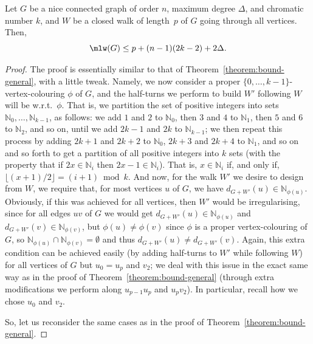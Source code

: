 \documentclass[a4paper,11pt,dvipsnames]{elsarticle}
\newcommand{\sam}[1]{\todo[size=\tiny,color=red!20!white]{\textbf{Sam:} #1}}
\newcommand{\sam}[1]{}
\begin{document}
\begin{theorem}\label{theorem:bound-chromatic}
Let $G$ be a nice connected graph of order $n$, maximum degree $\Delta$, and chromatic number $k$,
and $W$ be a closed walk of length~$p$ of $G$ going through all vertices. 
Then, $$\mlw(G) \leq p + (n-1)(2k-2)+2\Delta.$$
\end{theorem}

\begin{proof}
The proof is essentially similar to that of Theorem~\ref{theorem:bound-general}, with a little tweak. Namely, we now consider a proper $\{0,\dots,k-1\}$-vertex-colouring
$\phi$ of $G$, and the half-turns we perform to build $W'$ following $W$ will be w.r.t.~$\phi$.
That is, we partition the set of positive integers into sets $\mathbb{N}_0,\dots,\mathbb{N}_{k-1}$, as follows: we add $1$ and $2$ to $\mathbb{N}_0$, then $3$ and $4$ to $\mathbb{N}_1$, then $5$ and $6$ to $\mathbb{N}_2$, and so on, until we add $2k-1$ and $2k$ to $\mathbb{N}_{k-1}$; we then repeat this process by adding $2k+1$ and $2k+2$ to $\mathbb{N}_0$, $2k+3$ and $2k+4$ to $\mathbb{N}_1$, and so on and so forth to get a partition of all positive integers into $k$ sets (with the property that if $2x \in \mathbb{N}_i$ then $2x-1 \in \mathbb{N}_i$). That is, $x\in\mathbb N_i$ if, and only if, $\lfloor (x+1)/2 \rfloor = (i+1)\bmod k$.
And now, for the walk $W'$ we desire to design from $W$, we require that, for most vertices $u$ of $G$, we have $d_{G+W'}(u) \in\mathbb N_{\phi(u)}$. Obviously, if this was achieved for all vertices, then $W'$ would be irregularising, since for all edges $uv$ of $G$ we would get $d_{G+W'}(u) \in \mathbb N_{\phi(u)}$ and $d_{G+W'}(v) \in \mathbb N_{\phi(v)}$, but $\phi(u) \neq \phi(v)$ since $\phi$ is a proper vertex-colouring of $G$, so $\mathbb N_{\phi(u)} \cap \mathbb N_{\phi(v)} = \emptyset$ and thus $d_{G+W'}(u) \neq d_{G+W'}(v)$. Again, this extra condition can be achieved easily (by adding half-turns to $W'$ while following $W$) for all vertices of $G$ but $u_0=u_p$ and $v_2$; we deal with this issue in the exact same way as in the proof of Theorem~\ref{theorem:bound-general} (through extra modifications we perform along $u_{p-1}u_p$ and $u_pv_2$). In particular, recall how we chose $u_0$ and $v_2$.

So, let us reconsider the same cases as in the proof of Theorem~\ref{theorem:bound-general}. 


\end{proof}
\end{document}

